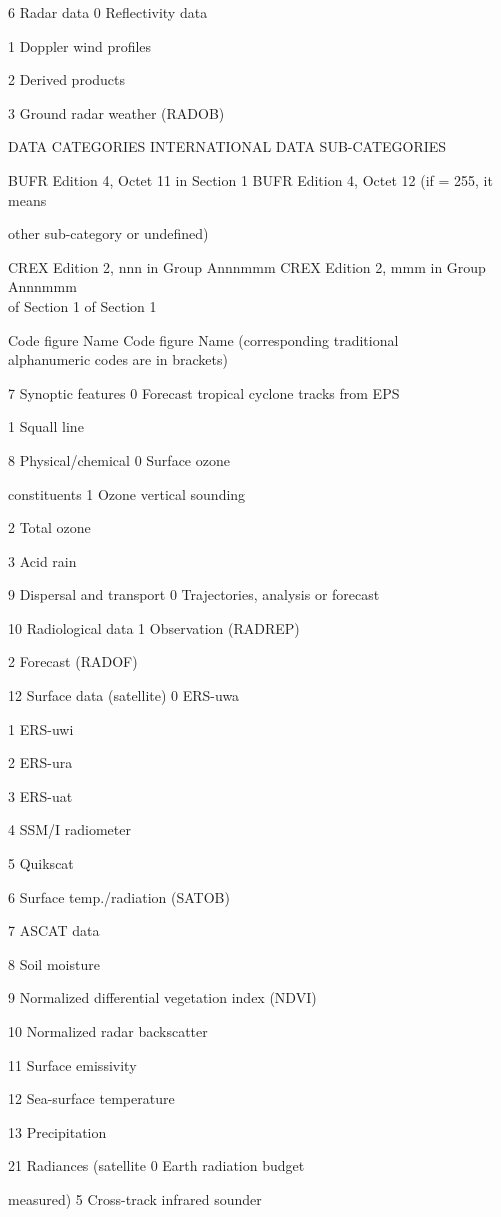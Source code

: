 6 Radar data 0 Reflectivity data

1 Doppler wind profiles

2 Derived products

3 Ground radar weather (RADOB)

DATA CATEGORIES INTERNATIONAL DATA SUB-CATEGORIES

BUFR Edition 4, Octet 11 in Section 1 BUFR Edition 4, Octet 12 (if = 255, it means

other sub-category or undefined)

CREX Edition 2, nnn in Group Annnmmm CREX Edition 2, mmm in Group Annnmmm\\
of Section 1 of Section 1

Code figure Name Code figure Name (corresponding traditional\\
alphanumeric codes are in brackets)

7 Synoptic features 0 Forecast tropical cyclone tracks from EPS

1 Squall line

8 Physical/chemical 0 Surface ozone

constituents 1 Ozone vertical sounding

2 Total ozone

3 Acid rain

9 Dispersal and transport 0 Trajectories, analysis or forecast

10 Radiological data 1 Observation (RADREP)

2 Forecast (RADOF)

12 Surface data (satellite) 0 ERS-uwa

1 ERS-uwi

2 ERS-ura

3 ERS-uat

4 SSM/I radiometer

5 Quikscat

6 Surface temp./radiation (SATOB)

7 ASCAT data

8 Soil moisture

9 Normalized differential vegetation index (NDVI)

10 Normalized radar backscatter

11 Surface emissivity

12 Sea-surface temperature

13 Precipitation

21 Radiances (satellite 0 Earth radiation budget

measured) 5 Cross-track infrared sounder

